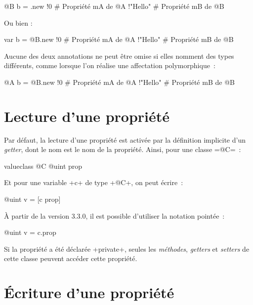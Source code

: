 \begin{galgas}
@B b = .new {
  !0 # Propriété mA de @A
  !"Hello" # Propriété mB de @B
}
\end{galgas}

Ou bien :
\begin{galgas}
var b = @B.new {
  !0 # Propriété mA de @A
  !"Hello" # Propriété mB de @B
}
\end{galgas}

Aucune des deux annotations ne peut être omise si elles nomment des types différents, comme lorsque l'on réalise une affectation polymorphique~:

\begin{galgas}
@A b = @B.new {
  !0 # Propriété mA de @A
  !"Hello" # Propriété mB de @B
}
\end{galgas}













\section{Lecture d'une propriété}

Par défaut, la lecture d'une propriété est activée par la définition implicite d'un \emph{getter}, dont le nom est le nom de la propriété. Ainsi, pour une classe \ggs=@C=~:

\begin{galgas}
valueclass @C {
  @uint prop
}
\end{galgas}

Et pour une variable \ggs+c+ de type \ggs+@C+, on peut écrire~:

\begin{galgas}
@uint v = [c prop]
\end{galgas}

À partir de la version 3.3.0, il est possible d'utiliser la notation pointée~:
\begin{galgas}
@uint v = c.prop
\end{galgas}

Si la propriété a été déclarée \ggs+private+, seules les \emph{méthodes}, \emph{getters} et \emph{setters} de cette classe peuvent accéder cette propriété.








\section{Écriture d'une propriété}


